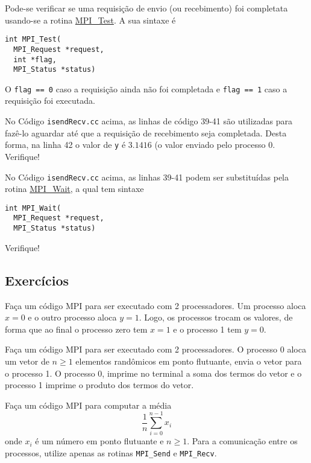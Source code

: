 Pode-se verificar se uma requisição de envio (ou recebimento) foi completata usando-se a rotina \href{https://www.open-mpi.org/doc/current/man3/MPI\_Test.3.php}{MPI\_Test}. A sua sintaxe é
\begin{verbatim}
int MPI_Test(
  MPI_Request *request, 
  int *flag, 
  MPI_Status *status)
\end{verbatim}
O \verb+flag == 0+ caso a requisição ainda não foi completada e \verb+flag == 1+ caso a requisição foi executada.

No Código \verb+isendRecv.cc+ acima, as linhas de código 39-41 são utilizadas para fazê-lo aguardar até que a requisição de recebimento seja completada. Desta forma, na linha 42 o valor de \verb+y+ é $3.1416$ (o valor enviado pelo processo 0. Verifique!

\begin{obs}
  No Código \verb+isendRecv.cc+ acima, as linhas 39-41 podem ser substituídas pela rotina \href{https://www.open-mpi.org/doc/current/man3/MPI\_Wait.3.php}{MPI\_Wait}, a qual tem sintaxe
\begin{verbatim}
int MPI_Wait(
  MPI_Request *request, 
  MPI_Status *status)
\end{verbatim}
  Verifique!
\end{obs}

\subsection{Exercícios}

\begin{exer}
  Faça um código MPI para ser executado com 2 processadores. Um processo aloca $x = 0$ e o outro processo aloca $y=1$. Logo, os processos trocam os valores, de forma que ao final o processo zero tem $x = 1$ e o processo 1 tem $y=0$.
\end{exer}

\begin{exer}
  Faça um código MPI para ser executado com 2 processadores. O processo 0 aloca um vetor de $n\geq 1$ elementos randômicos em ponto flutuante, envia o vetor para o processo 1. O processo 0, imprime no terminal a soma dos termos do vetor e o processo 1 imprime o produto dos termos do vetor.
\end{exer}


\begin{exer}
  Faça um código MPI para computar a média
  \begin{equation}
    \frac{1}{n}\sum_{i=0}^{n-1} x_i
  \end{equation}
  onde $x_i$ é um número em ponto flutuante e $n\geq 1$. Para a comunicação entre os processos, utilize apenas as rotinas \verb+MPI_Send+ e \verb+MPI_Recv+.
\end{exer}

